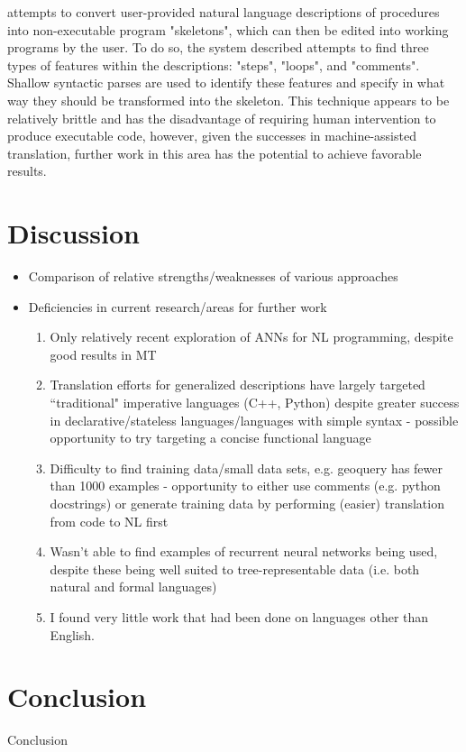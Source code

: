 \documentclass[a4paper,11pt]{proposal}
\begin{document}
\cite{mihalcea2006} attempts to convert user-provided natural language descriptions of procedures into non-executable program "skeletons", which can then be edited into working programs by the user. To do so, the system described attempts to find three types of features within the descriptions: "steps", "loops", and "comments". Shallow syntactic parses are used to identify these features and specify in what way they should be transformed into the skeleton. This technique appears to be relatively brittle and has the disadvantage of requiring human intervention to produce executable code, however, given the successes in machine-assisted translation, further work in this area has the potential to achieve favorable results.



\section{Discussion} \label{sec:disc}
\begin{itemize}
\item Comparison of relative strengths/weaknesses of various approaches
\item Deficiencies in current research/areas for further work
	\begin{enumerate}
	\item Only relatively recent exploration of ANNs for NL programming, despite good results in MT
	\item Translation efforts for generalized descriptions have largely targeted ``traditional" imperative languages (C++, Python) despite greater success in declarative/stateless languages/languages with simple syntax - possible opportunity to try targeting a concise functional language
	\item Difficulty to find training data/small data sets, e.g. geoquery has fewer than 1000 examples - opportunity to either use comments (e.g. python docstrings) or generate training data by performing (easier) translation from code to NL first
	\item Wasn't able to find examples of recurrent neural networks being used, despite these being well suited to tree-representable data (i.e. both natural and formal languages)
	\item I found very little work that had been done on languages other than English.
	\end{enumerate}
\end{itemize}



\section{Conclusion} \label{sec:conc}
Conclusion


\newpage


\end{document}
